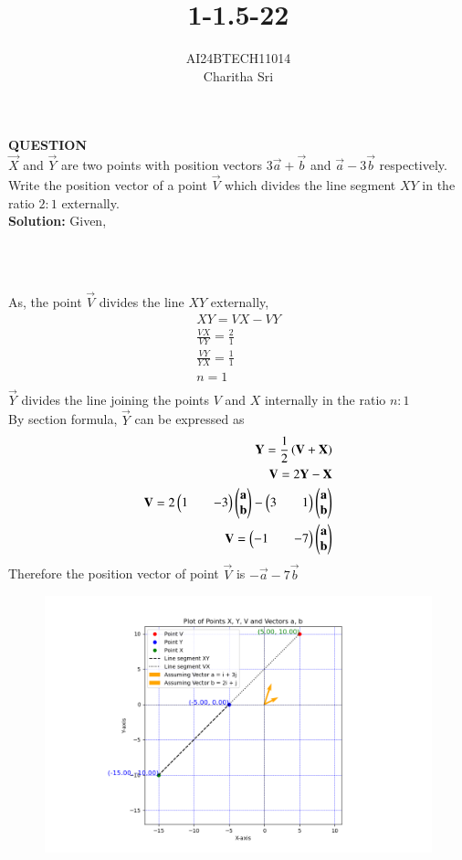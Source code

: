 \documentclass[journal]{IEEEtran}
\numberwithin{equation}{enumi}
\numberwithin{figure}{enumi}
\begin{document}


\title{1-1.5-22}
\author{AI24BTECH11014 \\ Charitha Sri}

{\let\newpage\relax\maketitle}

\textbf{QUESTION} \\$\vec{X}$ and $\vec{Y}$ are two points with position vectors $3\overrightarrow{a}+ \overrightarrow{b}$ and $\overrightarrow{a}-3\overrightarrow{b}$ respectively. Write
the position vector of a point $\vec{V}$ which divides the line segment $XY$ in the ratio $2 : 1$ externally.\\
\textbf{Solution:} Given,\\
\begin{table}[h!]    
  \centering

  \label{table: 1-1.5-22}
  \end{table}\\
\begin{table}[h!]
\centering

\end{table}\\
 As, the point $\vec{V}$ divides the line $XY$ externally,
\begin{align}
XY = VX - VY \\
\frac{VX}{VY}=\frac{2}{1}\\
\frac{VY}{YX}=\frac{1}{1}\\
 n = 1 \\
\end{align}
$\vec{Y}$ divides the line joining the points $V$ and $X$ internally in the ratio $n : 1$ \\
By section formula, $\vec{Y}$ can be expressed as\\ 
\begin{align}
\mathbf{Y}=\frac{1}{2}\left(\mathbf{V}+\mathbf{X}\right)\\
\mathbf{V} = 2\mathbf{Y} -\mathbf{X} \\
 \mathbf{V} = 2\begin{pmatrix} 1 && -3\end{pmatrix}\begin{pmatrix} \mathbf{a} \\ \mathbf{b}\end{pmatrix} - \begin{pmatrix}3 && 1\end{pmatrix}\begin{pmatrix}\mathbf{a} \\ \mathbf{b}\end{pmatrix}\\
 \mathbf{V}= \begin{pmatrix}-1 && -7\end{pmatrix}\begin{pmatrix}\mathbf{a} \\ \mathbf{b}\end{pmatrix} \\
\end{align}
 Therefore the position vector of point $\vec{V}$ is $-\overrightarrow{a}-7\overrightarrow{b}$
\begin{figure}[ht]
        \centering
        \includegraphics[width=0.7\linewidth]{figs/fig.png}
        \caption{}
        \label{graph}
\end{figure}
\end{document}

